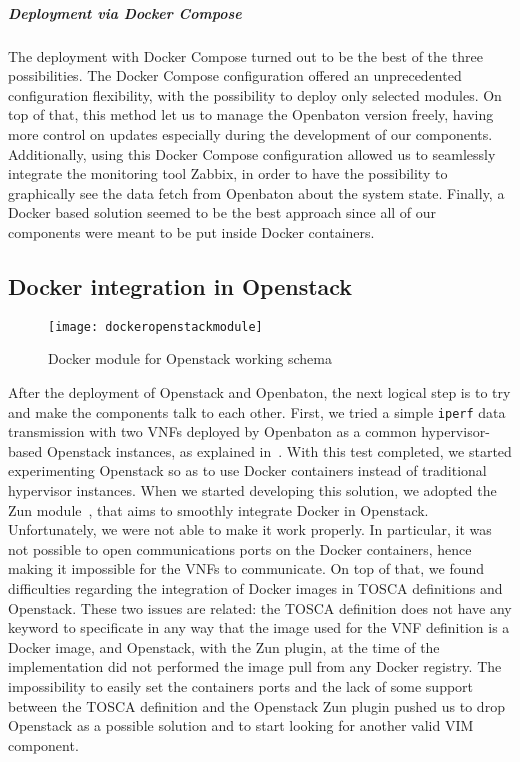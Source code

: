 \subparagraph*{Deployment via Docker Compose}
The deployment with Docker Compose turned out to be the best of the three
possibilities. The Docker Compose configuration offered an unprecedented
configuration flexibility, with the possibility to deploy only selected modules.
On top of that, this method let us to manage the Openbaton version freely,
having more control on updates especially during the development of our
components. Additionally, using this Docker Compose configuration allowed us to
seamlessly integrate the monitoring tool Zabbix, in order to have the
possibility to graphically see the data fetch from Openbaton about the system
state. Finally, a Docker based solution seemed to be the best approach since all
of our components were meant to be put inside Docker containers.

\vfill

\subsection{Docker integration in Openstack}

\begin{figure}[t]
  \centering
  \texttt{[image: dockeropenstackmodule]}
  \caption[Docker module for Openstack working schema]{Docker module for
    Openstack working schema~\cite{openstackDockerModule}}
  \label{chap:archimpl:sec:fistattempt:img:dockeropnestackmodule}
\end{figure}

After the deployment of Openstack and Openbaton, the next logical step is to try
and make the components talk to each other. First, we tried a simple
\verb!iperf! data transmission with two VNFs deployed by Openbaton as a common
hypervisor-based Openstack instances, as explained in~\cite{openbatonIperf}.
With this test completed, we started experimenting Openstack so as to use Docker
containers instead of traditional hypervisor instances. When we started
developing this solution, we adopted the Zun module~\cite{zunmoduleos}, that
aims to smoothly integrate Docker in Openstack. Unfortunately, we were not able
to make it work properly. In particular, it was not possible to open
communications ports on the Docker containers, hence making it impossible for
the VNFs to communicate. On top of that, we found difficulties regarding the
integration of Docker images in TOSCA definitions and Openstack. These two
issues are related: the TOSCA definition does not have any keyword to
specificate in any way that the image used for the VNF definition is a Docker
image, and Openstack, with the Zun plugin, at the time of the implementation did
not performed the image pull from any Docker registry. The impossibility to
easily set the containers ports and the lack of some support between the TOSCA
definition and the Openstack Zun plugin pushed us to drop Openstack as a
possible solution and to start looking for another valid VIM component.

